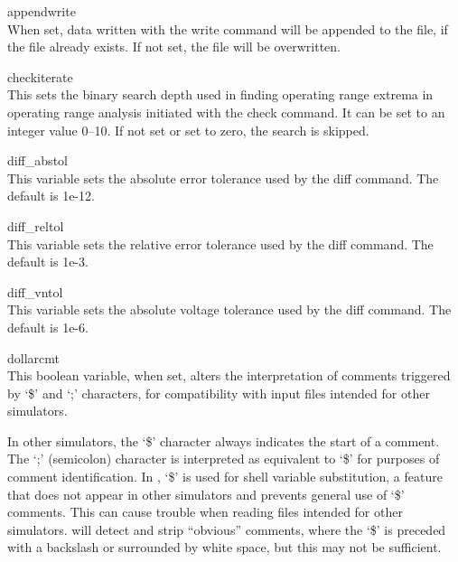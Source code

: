 \begin{description}
\item{\et appendwrite}\\
When set, data written with the {\cb write} command will be appended
to the file, if the file already exists.  If not set, the
file will be overwritten.

\item{\et checkiterate}\\
This sets the binary search depth used in finding operating range
extrema in operating range analysis initiated with the {\cb check}
command.  It can be set to an integer value 0--10.  If not set or set
to zero, the search is skipped.

\item{\et diff\_abstol}\\
This variable sets the absolute error tolerance used by the {\cb diff}
command.  The default is 1e-12.

\item{\et diff\_reltol}\\
This variable sets the relative error tolerance used by the {\cb diff}
command.  The default is 1e-3.

\item{\et diff\_vntol}\\
This variable sets the absolute voltage tolerance used by the {\cb
diff} command.  The default is 1e-6.

\item{\et dollarcmt}\\
This boolean variable, when set, alters the interpretation of comments
triggered by `{\vt \$}' and `{\vt ;}' characters, for compatibility
with input files intended for other simulators.

In other simulators, the `{\vt \$}' character always indicates the
start of a comment.  The `{\vt ;}' (semicolon) character is
interpreted as equivalent to `{\vt \$}' for purposes of comment
identification.  In {\WRspice}, `{\vt \$}' is used for shell variable
substitution, a feature that does not appear in other simulators and
prevents general use of `{\vt \$}' comments.  This can cause trouble
when reading files intended for other simulators.  {\WRspice} will
detect and strip ``obvious'' comments, where the `{\vt \$}' is
preceded with a backslash or surrounded by white space, but this may
not be sufficient.


\end{description}
